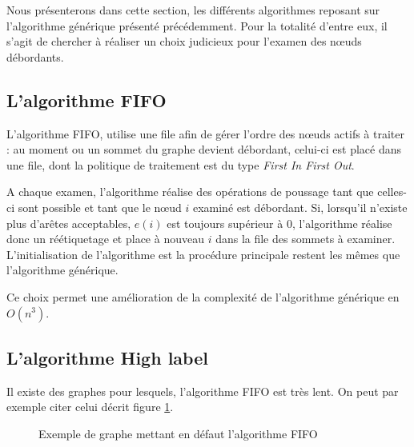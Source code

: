 Nous présenterons dans cette section, les différents algorithmes reposant sur l'algorithme générique
présenté précédemment. Pour la totalité d'entre eux, il s'agit de chercher à réaliser un choix
judicieux pour l'examen des n\oe uds débordants.

\subsection{L'algorithme FIFO}

L'algorithme FIFO, utilise une file afin de gérer l'ordre des n\oe uds actifs à traiter : au moment
ou un sommet du graphe devient débordant, celui-ci est placé dans une file, dont la politique de
traitement est du type \emph{First In First Out}. 

A chaque examen, l'algorithme réalise des opérations de poussage tant que celles-ci sont possible et
tant que le n\oe ud $i$ examiné est débordant. Si, lorsqu'il n'existe plus d'arêtes acceptables,
$e(i)$ est toujours supérieur à $0$, l'algorithme réalise donc un réétiquetage et place à nouveau
$i$ dans la file des sommets à examiner. L'initialisation de l'algorithme est la procédure
principale restent les mêmes que l'algorithme générique.

Ce choix permet une amélioration de la complexité de l'algorithme générique en $O(n^3)$.

\subsection{L'algorithme High label}

Il existe des graphes pour lesquels, l'algorithme FIFO est très lent. On peut par exemple citer
celui décrit figure \ref{bad_fifo}.

\begin{figure}
\begin{center}
\end{center}
\caption{Exemple de graphe mettant en défaut l'algorithme FIFO}
\label{bad_fifo}
\end{figure}

